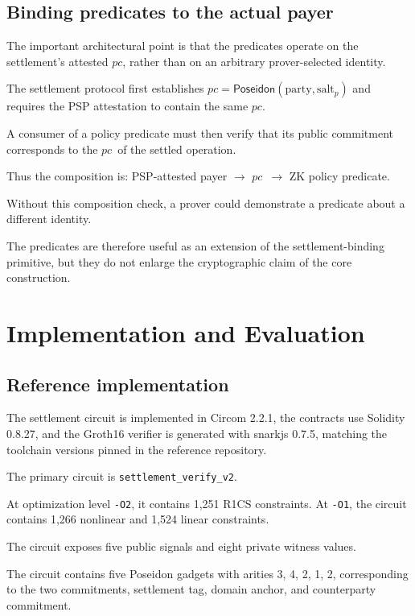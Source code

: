 \documentclass[10pt,twocolumn]{article}
\newcommand{\Poseidon}{\ensuremath{\mathsf{Poseidon}}}
\newcommand{\code}[1]{\texttt{#1}}
\newcommand{\party}{\ensuremath{\text{party}}}
\newcommand{\salt}{\ensuremath{\text{salt}}}
\newcommand{\pc}{\ensuremath{\mathit{pc}}}
\begin{document}
\subsection{Binding predicates to the actual payer}

The important architectural point is that the predicates operate on the
settlement's attested \pc, rather than on an arbitrary prover-selected
identity.

The settlement protocol first establishes $\pc=\Poseidon(\party,\salt_p)$
and requires the PSP attestation to contain the same \pc.

A consumer of a policy predicate must then verify that its public
commitment corresponds to the \pc\ of the settled operation.

Thus the composition is: PSP-attested payer $\rightarrow$ \pc\
$\rightarrow$ ZK policy predicate.

Without this composition check, a prover could demonstrate a predicate
about a different identity.

The predicates are therefore useful as an extension of the
settlement-binding primitive, but they do not enlarge the cryptographic
claim of the core construction.

\section{Implementation and Evaluation}
\label{sec:impl}

\subsection{Reference implementation}

The settlement circuit is implemented in Circom 2.2.1, the contracts use
Solidity 0.8.27, and the Groth16 verifier is generated with snarkjs
0.7.5, matching the toolchain versions pinned in the reference
repository.

The primary circuit is \code{settlement\_verify\_v2}.

At optimization level \code{-O2}, it contains 1,251 R1CS constraints. At
\code{-O1}, the circuit contains 1,266 nonlinear and 1,524 linear
constraints.

The circuit exposes five public signals and eight private witness
values.

The circuit contains five Poseidon gadgets with arities 3, 4, 2, 1, 2,
corresponding to the two commitments, settlement tag, domain anchor, and
counterparty commitment.
\end{document}
